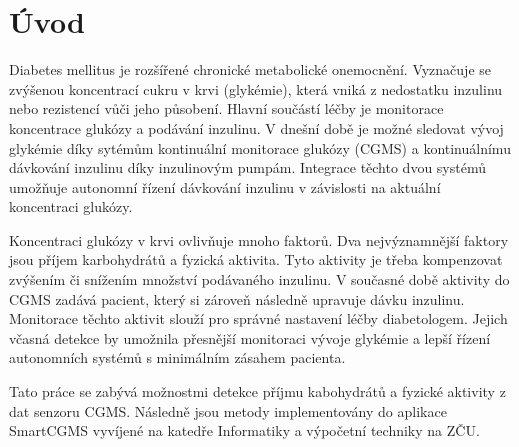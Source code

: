 \chapter{Úvod}

Diabetes mellitus je rozšířené chronické metabolické onemocnění. Vyznačuje se zvýšenou koncentrací cukru v krvi (glykémie), která vniká z nedostatku inzulinu nebo rezistencí vůči jeho působení. Hlavní součástí léčby je monitorace koncentrace glukózy a podávání inzulinu. V dnešní době je možné sledovat vývoj glykémie díky sytémům kontinuální monitorace glukózy (CGMS) a kontinuálnímu dávkování inzulinu díky inzulinovým pumpám. Integrace těchto dvou systémů umožňuje autonomní řízení dávkování inzulinu v závislosti na aktuální koncentraci glukózy.

Koncentraci glukózy v krvi ovlivňuje mnoho faktorů. Dva nejvýznamnější faktory jsou příjem karbohydrátů a fyzická aktivita. Tyto aktivity je třeba kompenzovat zvýšením či snížením množství podávaného inzulinu. V současné době aktivity do CGMS zadává pacient, který si zároveň následně upravuje dávku inzulinu. Monitorace těchto aktivit slouží pro správné nastavení léčby diabetologem. Jejich včasná detekce by umožnila přesnější monitoraci vývoje glykémie a lepší řízení autonomních systémů s minimálním zásahem pacienta.

Tato práce se zabývá možnostmi detekce příjmu kabohydrátů a fyzické aktivity z dat senzoru CGMS. Následně jsou metody implementovány do aplikace SmartCGMS vyvíjené na katedře Informatiky a výpočetní techniky na ZČU.